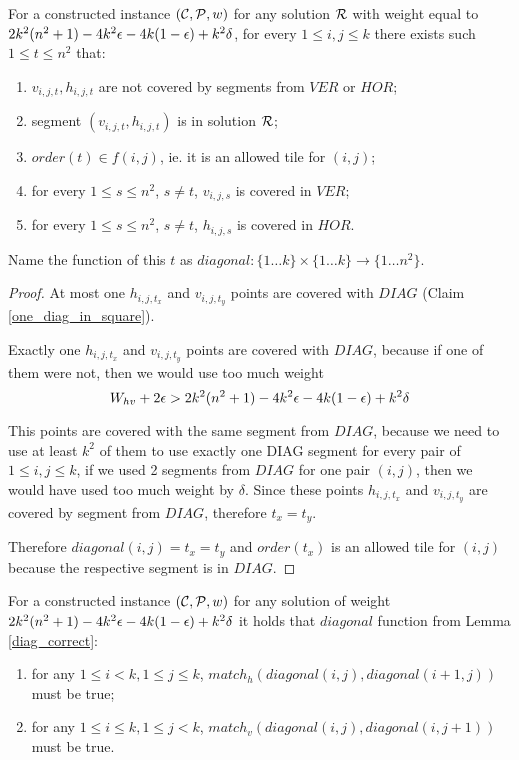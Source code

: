 \begin{lemma}
\label{diag_correct}
For a constructed instance $(\mathcal{C}, \mathcal{P}, w)$
for any solution $\mathcal{R}$ with weight equal to $2k^2(n^2+1) - 4k^2\epsilon -4k(1-\epsilon) +k^2\delta$,
for every $1 \le i,j \le k$
there exists such $1 \le t \le n^2$ that:
\begin{enumerate}[label={(\arabic*)}]
\item $v_{i,j,t}, h_{i,j,t}$ are not covered by segments from $VER$ or $HOR$;
\item segment $(v_{i,j,t}, h_{i,j,t})$ is in solution $\mathcal{R}$;
\item $order(t) \in f(i,j)$, ie. it is an allowed tile for $(i,j)$;
\item for every $1 \le s\le n^2$, $s \neq t$, $v_{i,j,s}$ is covered in $VER$;
\item for every $1 \le s\le n^2$, $s \neq t$, $h_{i,j,s}$ is covered in $HOR$.
\end{enumerate}
Name the function of this $t$ as
$diagonal : \{1 \ldots k\} \times \{1 \ldots k\} \rightarrow \{1 \ldots n^2\}$.
\end{lemma}

\begin{proof}
At most one $h_{i,j,t_x}$ and $v_{i,j,t_y}$
points are covered with $DIAG$
(Claim \ref{one_diag_in_square}).
	
Exactly one $h_{i,j,t_x}$ and $v_{i,j,t_y}$
points are covered with $DIAG$,
because if one of them were not, then we would use too much weight
$$W_{hv} + 2\epsilon > 2k^2(n^2+1) - 4k^2\epsilon -4k(1-\epsilon) +k^2\delta$$

This points are covered with the same segment from $DIAG$,
because we need to use at least $k^2$ of them to use
exactly one DIAG segment for every pair of $1 \le i,j \le k$,
if we used 2 segments from $DIAG$
for one pair $(i,j)$,
then we would have used too much weight by $\delta$.
Since these points $h_{i,j,t_x}$ and $v_{i,j,t_y}$ are covered by
segment from $DIAG$, therefore $t_x = t_y$.

Therefore $diagonal(i,j) = t_x = t_y$
and $order(t_x)$ is an allowed tile for $(i,j)$
because the respective segment is in $DIAG$.

\end{proof}

\begin{lemma}
\label{vertical_horizontal_synchronized}
For a constructed instance $(\mathcal{C}, \mathcal{P}, w)$
for any solution of weight $2k^2(n^2+1) - 4k^2\epsilon -4k(1-\epsilon) +k^2\delta$ it holds that $diagonal$ function
from Lemma \ref{diag_correct}:
\begin{enumerate}
\item 
for any $1 \le i < k, 1 \le j \le k$,
$match_h(diagonal(i, j),diagonal(i+1, j))$ must be true;
\item 
for any $1 \le i \le k, 1 \le j < k$,
$match_v(diagonal(i, j),diagonal(i, j+1))$ must be true.
\end{enumerate}
\end{lemma}

